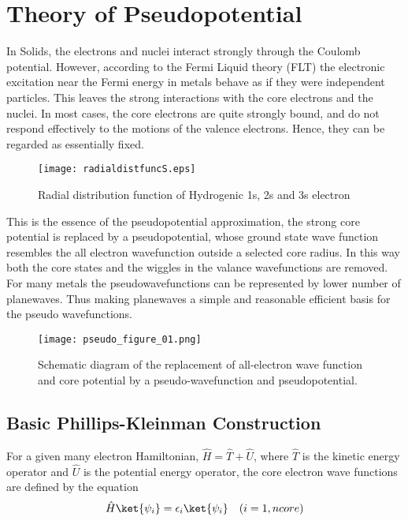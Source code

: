 \section{Theory of Pseudopotential}
In Solids, the electrons and nuclei interact strongly through the Coulomb potential. However, according to the Fermi Liquid theory (FLT) the electronic excitation near the Fermi energy in metals behave as if they were independent particles. This leaves the strong interactions with the core electrons and the nuclei. In most cases, the core electrons are quite strongly bound, and do not respond effectively to the motions of the valence electrons. Hence, they can be regarded as essentially fixed.
\begin{center}
\begin{figure}
\texttt{[image: radialdistfuncS.eps]}
\caption{Radial distribution function of Hydrogenic 1s, 2s and 3s electron}
\end{figure}
\end{center}
This is the essence of the pseudopotential approximation, the strong core potential is replaced by a pseudopotential, whose ground state wave function resembles the all electron wavefunction outside a selected core radius. In this way both the core states and the wiggles in the valance wavefunctions are removed. For many metals the pseudowavefunctions can be represented by lower number of planewaves. Thus making planewaves a simple and reasonable efficient basis for the pseudo wavefunctions.
\begin{figure}
\texttt{[image: pseudo\_figure\_01.png]}
\caption{Schematic diagram of the replacement of all-electron wave function and core potential by a pseudo-wavefunction and pseudopotential.}
\end{figure}
\subsection{Basic Phillips-Kleinman Construction}
For a given many electron Hamiltonian, $\hat{H}=\hat{T}+\hat{U}$, where $\hat{T}$ is the kinetic energy operator and $\hat{U}$ is the potential energy operator, the core electron wave functions are defined by the \schrod equation
\begin{equation}
 \hat{H}\ket{\psi_i} = \epsilon_i \ket{\psi_i} \quad   (i = 1, n core)
\end{equation}

